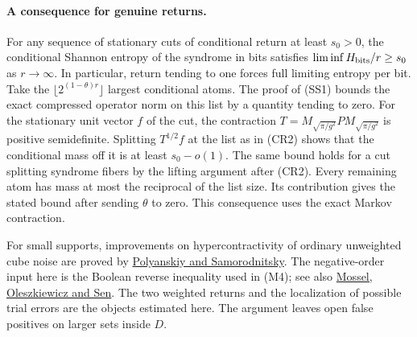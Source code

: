 \paragraph{A consequence for genuine returns.}
For any sequence of stationary cuts of conditional return at least
$s_0>0$, the conditional Shannon entropy of the syndrome in bits
satisfies $\liminf H_{\rm bits}/r\ge s_0$ as $r\to\infty$.
In particular, return tending to one forces full limiting entropy per bit.
Take the $\lfloor 2^{(1-\theta)r}\rfloor$ largest conditional atoms.
The proof of (SS1) bounds the exact compressed operator norm on this
list by a quantity tending to zero. For the stationary unit vector $f$ of
the cut, the contraction $T=M_{\sqrt{\pi/g^2}}P M_{\sqrt{\pi/g^2}}$
is positive semidefinite. Splitting $T^{1/2}f$ at the list as in (CR2)
shows that the conditional mass off it is at least $s_0-o(1)$.
The same bound holds for a cut splitting syndrome fibers by the lifting
argument after (CR2). Every remaining atom has mass at most the reciprocal
of the list size. Its contribution gives the stated bound after sending
$\theta$ to zero. This consequence uses the exact Markov contraction.

For small supports, improvements on hypercontractivity of ordinary
unweighted cube noise are proved by
\href{https://arxiv.org/abs/1606.07491}{Polyanskiy and Samorodnitsky}.
The negative-order input here is the Boolean reverse inequality used in
(M4); see also \href{https://arxiv.org/abs/1108.1210}{Mossel, Oleszkiewicz
and Sen}. The two weighted returns and the localization of possible trial
errors are the objects estimated here. The argument leaves open false
positives on larger sets inside $D$.
